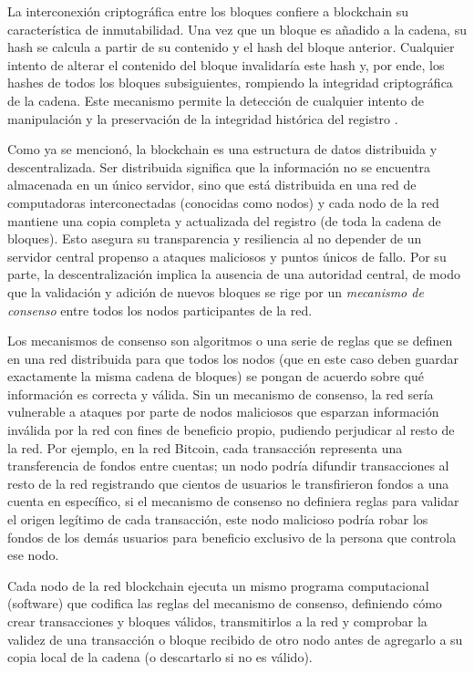 La interconexión criptográfica entre los bloques confiere a blockchain su característica de inmutabilidad. Una vez que un bloque es añadido a la cadena, su hash se calcula a partir de su contenido y el hash del bloque anterior. Cualquier intento de alterar el contenido del bloque invalidaría este hash y, por ende, los hashes de todos los bloques subsiguientes, rompiendo la integridad criptográfica de la cadena. Este mecanismo permite la detección de cualquier intento de manipulación y la preservación de la integridad histórica del registro \cite{bulkowska2023implementation}. 

Como ya se mencionó, la blockchain es una estructura de datos distribuida y descentralizada. Ser distribuida significa que la información no se encuentra almacenada en un único servidor, sino que está distribuida en una red de computadoras interconectadas (conocidas como nodos) y cada nodo de la red mantiene una copia completa y actualizada del registro (de toda la cadena de bloques). Esto asegura su transparencia y resiliencia al no depender de un servidor central \cite{bulkowska2023implementation} propenso a ataques maliciosos y puntos únicos de fallo. Por su parte, la descentralización implica la ausencia de una autoridad central, de modo que la validación y adición de nuevos bloques se rige por un \textit{mecanismo de consenso} entre todos los nodos participantes de la red. 

Los mecanismos de consenso son algoritmos o una serie de reglas que se definen en una red distribuida para que todos los nodos (que en este caso deben guardar exactamente la misma cadena de bloques) se pongan de acuerdo sobre qué información es correcta y válida. Sin un mecanismo de consenso, la red sería vulnerable a ataques por parte de nodos maliciosos que esparzan información inválida por la red con fines de beneficio propio, pudiendo perjudicar al resto de la red. Por ejemplo, en la red Bitcoin, cada transacción representa una transferencia de fondos entre cuentas; un nodo podría difundir transacciones al resto de la red registrando que cientos de usuarios le transfirieron fondos a una cuenta en específico, si el mecanismo de consenso no definiera reglas para validar el origen legítimo de cada transacción, este nodo malicioso podría robar los fondos de los demás usuarios para beneficio exclusivo de la persona que controla ese nodo.

Cada nodo de la red blockchain ejecuta un mismo programa computacional (software) que codifica las reglas del mecanismo de consenso, definiendo cómo crear transacciones y bloques válidos, transmitirlos a la red y comprobar la validez de una transacción o bloque recibido de otro nodo antes de agregarlo a su copia local de la cadena (o descartarlo si no es válido).


